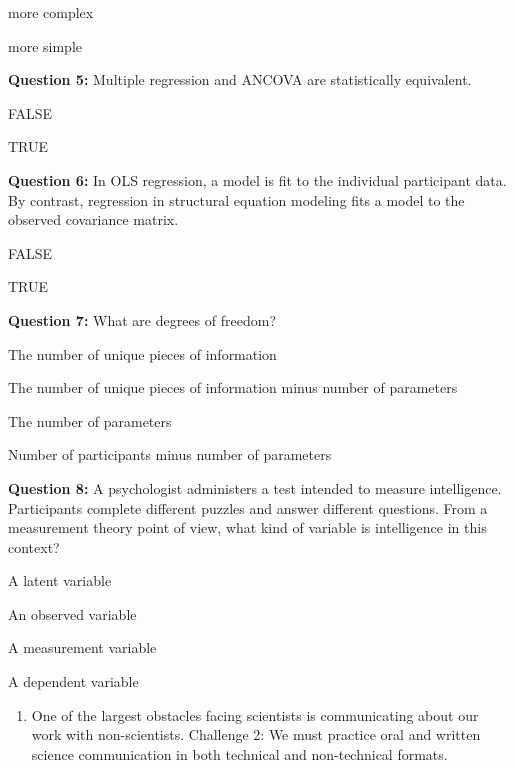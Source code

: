 \documentclass[
]{krantz}
\providecommand{\tightlist}{%
  \setlength{\itemsep}{0pt}\setlength{\parskip}{0pt}}
\begin{document}
more complex

more simple

\hypertarget{collapseExample4}{}
\hypertarget{answerFeedback4}{}

\textbf{Question 5:}
Multiple regression and ANCOVA are statistically equivalent.

FALSE

TRUE

\hypertarget{collapseExample5}{}
\hypertarget{answerFeedback5}{}

\textbf{Question 6:}
In OLS regression, a model is fit to the individual participant data. By contrast, regression in structural equation modeling fits a model to the observed covariance matrix.

FALSE

TRUE

\hypertarget{collapseExample6}{}
\hypertarget{answerFeedback6}{}

\textbf{Question 7:}
What are degrees of freedom?

The number of unique pieces of information

The number of unique pieces of information minus number of parameters

The number of parameters

Number of participants minus number of parameters

\hypertarget{collapseExample7}{}
\hypertarget{answerFeedback7}{}

\textbf{Question 8:}
A psychologist administers a test intended to measure intelligence. Participants complete different puzzles and answer different questions. From a measurement theory point of view, what kind of variable is intelligence in this context?

A latent variable

An observed variable

A measurement variable

A dependent variable

\hypertarget{collapseExample8}{}
\hypertarget{answerFeedback8}{}

\begin{enumerate}
\def\labelenumi{\arabic{enumi}.}
\setcounter{enumi}{1}
\tightlist
\item
  One of the largest obstacles facing scientists is communicating about our work with non-scientists. Challenge 2: We must practice oral and written science communication in both technical and non-technical formats.
\end{enumerate}
\end{document}
